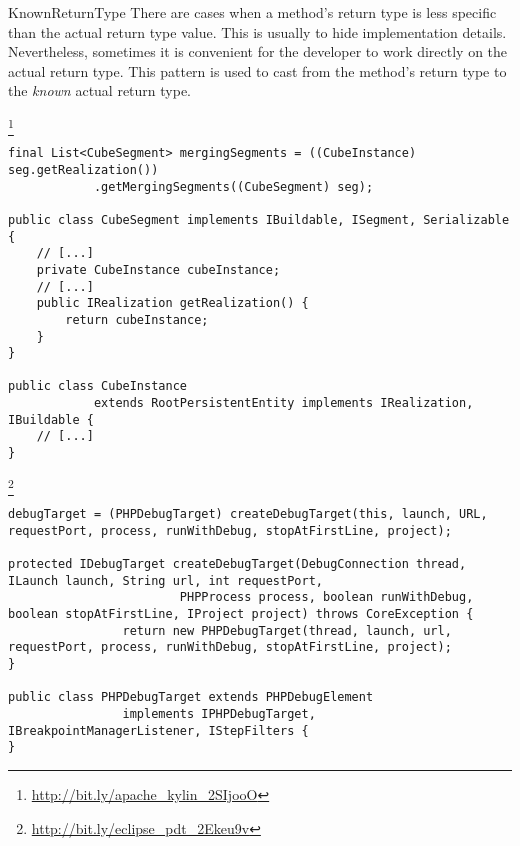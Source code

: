 \begin{pattern}{KnownReturnType}
There are cases when a method's return type is less specific than the
actual return type value.
This is usually to hide implementation details.
Nevertheless, sometimes it is convenient for the developer to work
directly on the actual return type.
%
%
This pattern is used to cast from the method's return type to
the \emph{known} actual return type.

\instances{}

\footnote{\url{http://bit.ly/apache_kylin_2SIjooO}}

\begin{verbatim}
final List<CubeSegment> mergingSegments = ((CubeInstance) seg.getRealization())
            .getMergingSegments((CubeSegment) seg);

public class CubeSegment implements IBuildable, ISegment, Serializable {
    // [...]
    private CubeInstance cubeInstance;
    // [...]
    public IRealization getRealization() {
        return cubeInstance;
    }
}

public class CubeInstance
            extends RootPersistentEntity implements IRealization, IBuildable {
    // [...]
}
\end{verbatim}


\footnote{\url{http://bit.ly/eclipse_pdt_2Ekeu9v}}

\begin{verbatim}
debugTarget = (PHPDebugTarget) createDebugTarget(this, launch, URL, requestPort, process, runWithDebug, stopAtFirstLine, project);
    
protected IDebugTarget createDebugTarget(DebugConnection thread, ILaunch launch, String url, int requestPort,
                        PHPProcess process, boolean runWithDebug, boolean stopAtFirstLine, IProject project) throws CoreException {
                return new PHPDebugTarget(thread, launch, url, requestPort, process, runWithDebug, stopAtFirstLine, project);
}

public class PHPDebugTarget extends PHPDebugElement
                implements IPHPDebugTarget, IBreakpointManagerListener, IStepFilters {
}
\end{verbatim}


\detection{}

\discussion{}

\related{}

\end{pattern}